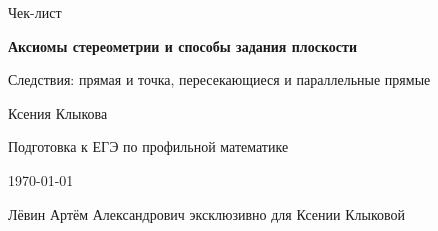 \documentclass[a4paper,12pt]{article}
\begin{document}

\begin{titlepage}
\thispagestyle{empty}
\centering

\vspace*{2.2cm}

{\Large\textcolor{darkaccent}{Чек-лист}\par}

\vspace{0.7cm}

{\huge\bfseries
Аксиомы стереометрии и способы задания плоскости
\par}

\vspace{1.1cm}

{\large
Следствия: прямая и точка, пересекающиеся и параллельные прямые
\par}

\vfill

{\large Ксения Клыкова\par}

\vspace{0.3cm}

{\normalsize
Подготовка к ЕГЭ по профильной математике
\par}

\vspace{0.8cm}

{\normalsize \today\par}

\vfill

{\normalsize
Лёвин Артём Александрович эксклюзивно для Ксении Клыковой
\par}

\vspace{1.1cm}


\end{titlepage}

\setcounter{page}{1}

\end{document}
